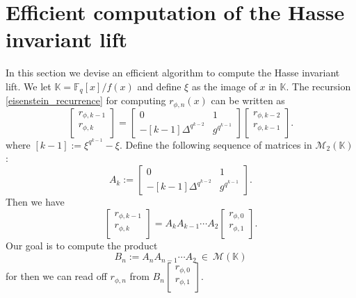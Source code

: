 \documentclass{article}
\theoremstyle{plain}
\theoremstyle{definition}
\def\F{\ensuremath{\mathbb{F}}}
\def\K{\ensuremath{\mathbb{K}}}
\begin{document}
\section{Efficient computation of the Hasse invariant lift}
\label{sec:hasse}

In this section we devise an efficient algorithm to compute the Hasse invariant lift. We let $\K = \F_q[x]/f(x)$ and define $\xi$ as the image of $x$ in $\K$. The recursion \ref{eisenstein_recurrence} for computing $r_{\phi,n}(x)$ can be written as
\[
\begin{bmatrix}
r_{\phi,k - 1} \\
r_{\phi,k} \\
\end{bmatrix} = 
\begin{bmatrix}
0 & 1 \\
-[k - 1]\Delta^{q^{k - 2}} & g^{q^{k - 1}}
\end{bmatrix}
\begin{bmatrix}
r_{\phi,k - 2} \\
r_{\phi,k - 1} \\
\end{bmatrix}.
\]
where $[k - 1]:=\xi^{q^{k - 1}}-\xi$. Define the following sequence of matrices in 
$\mathscr{M}_2(\K)$:
\[
A_k :=\begin{bmatrix}
0 & 1 \\
-[k - 1]\Delta^{q^{k - 2}} & g^{q^{k - 1}}
\end{bmatrix}.
\]
Then we have
\[
\begin{bmatrix}
r_{\phi,k - 1} \\
r_{\phi,k} \\
\end{bmatrix} = 
A_kA_{k - 1} \cdots A_2
\begin{bmatrix}
r_{\phi,0} \\
r_{\phi,1} \\
\end{bmatrix}.
\]
Our goal is to compute the product 
\[B_n := A_nA_{n - 1} \cdots A_2 ~ \in ~ \mathscr{M}(\K)\]
for then we can read off $r_{\phi,n}$ from $B_n\begin{bmatrix}
r_{\phi,0} \\
r_{\phi,1} \\
\end{bmatrix}.$ 
\end{document}
